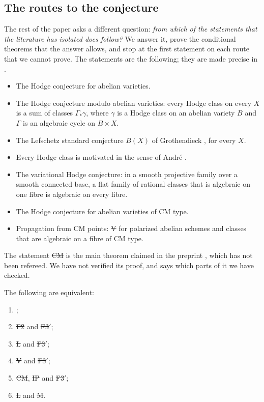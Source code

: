 \subsection*{The routes to the conjecture}
The rest of the paper asks a different question: \emph{from which of the
statements that the literature has isolated does \HC{} follow?} We answer
it, prove the conditional theorems that the answer allows, and stop at the
first statement on each route that we cannot prove. The statements are the
following; they are made precise in .
\begin{itemize}[leftmargin=2.6em]
\item[\st{F2}] The Hodge conjecture for abelian varieties.
\item[\st{F3$'$}] The Hodge conjecture modulo abelian varieties: every Hodge
class on every $X$ is a sum of classes $\Gamma_{*}\gamma$, where $\gamma$ is
a Hodge class on an abelian variety $B$ and $\Gamma$ is an algebraic cycle on
$B\times X$.
\item[\st{L}] The Lefschetz standard conjecture $B(X)$ of Grothendieck
\cite{Gro69}, for every $X$.
\item[\st{M}] Every Hodge class is motivated in the sense of Andr\'e
\cite{And96}.
\item[\st{V}] The variational Hodge conjecture: in a smooth projective
family over a smooth connected base, a flat family of rational classes that
is algebraic on one fibre is algebraic on every fibre.
\item[\st{CM}] The Hodge conjecture for abelian varieties of CM type.
\item[\st{IP}] Propagation from CM points: \st{V} for polarized abelian
schemes and classes that are algebraic on a fibre of CM type.
\end{itemize}
The statement \st{CM} is the main theorem claimed in the preprint
\cite{OAI26}, which has not been refereed. We have not verified its proof,
and  says which parts of it we have checked.

\begin{maintheorem}\label{thm:equiv}
The following are equivalent:
\begin{enumerate}[label=\textup{(\roman*)}]
\item \HC;
\item \st{F2} and \st{F3$'$};
\item \st{L} and \st{F3$'$};
\item \st{V} and \st{F3$'$};
\item \st{CM}, \st{IP} and \st{F3$'$};
\item \st{L} and \st{M}.
\end{enumerate}
\end{maintheorem}

